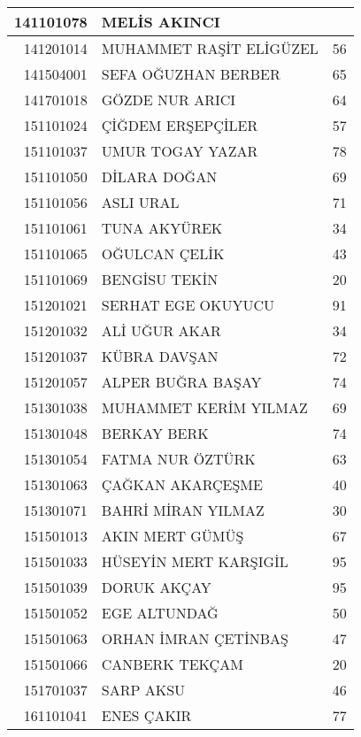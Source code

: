 \documentclass[12pt]{article}
\begin{document}
\begin{multicols}{2}
\begin{longtable}{||r||l||r||}
    141101078 & MELİS AKINCI &  \\
    \midrule
    141201014 & MUHAMMET RAŞİT ELİGÜZEL & 56 \\
    \midrule
    141504001 & SEFA OĞUZHAN BERBER & 65 \\
    \midrule
    141701018 & GÖZDE NUR ARICI & 64 \\
    \midrule
    151101024 & ÇİĞDEM ERŞEPÇİLER & 57 \\
    \midrule
    151101037 & UMUR TOGAY YAZAR & 78 \\
    \midrule
    151101050 & DİLARA DOĞAN & \cellcolor[rgb]{ 1,  1,  0} 69 \\
    \midrule
    151101056 & ASLI URAL & 71 \\
    \midrule
    151101061 & TUNA AKYÜREK & 34 \\
    \midrule
    151101065 & OĞULCAN ÇELİK & 43 \\
    \midrule
    151101069 & BENGİSU TEKİN & 20 \\
    \midrule
    151201021 & SERHAT EGE OKUYUCU & 91 \\
    \midrule
    151201032 & ALİ UĞUR AKAR & 34 \\
    \midrule
    151201037 & KÜBRA DAVŞAN & 72 \\
    \midrule
    151201057 & ALPER BUĞRA BAŞAY & 74 \\
    \midrule
    151301038 & MUHAMMET KERİM YILMAZ & 69 \\
    \midrule
    151301048 & BERKAY BERK & 74 \\
    \midrule
    151301054 & FATMA NUR ÖZTÜRK & 63 \\
    \midrule
    151301063 & ÇAĞKAN AKARÇEŞME & 40 \\
    \midrule
    151301071 & BAHRİ MİRAN YILMAZ & 30 \\
    \midrule
    151501013 & AKIN MERT GÜMÜŞ & 67 \\
    \midrule
    151501033 & HÜSEYİN MERT KARŞIGİL & 95 \\
    \midrule
    151501039 & DORUK AKÇAY & 95 \\
    \midrule
    151501052 & EGE ALTUNDAĞ & 50 \\
    \midrule
    151501063 & ORHAN İMRAN ÇETİNBAŞ & 47 \\
    \midrule
    151501066 & CANBERK TEKÇAM & 20 \\
    \midrule
    151701037 & SARP AKSU & 46 \\
    \midrule
    161101041 & ENES ÇAKIR & 77 \\

\end{longtable}
\end{multicols}
\end{document}
